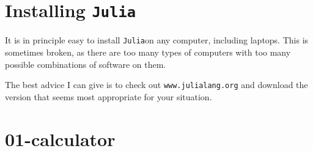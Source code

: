 \documentclass[12pt,answers]{book}
\newcommand{\julia}{{\tt Julia}}
\begin{document}
\chapter*{Installing \julia}

It is in principle easy to install \julia on any computer, including laptops. This is sometimes broken, as there are too many types of computers with too many possible combinations of software on them.

The best advice I can give is to check out \verb|www.julialang.org| and download the version that seems most appropriate for your situation.


\chapter{01-calculator}
\end{document}

